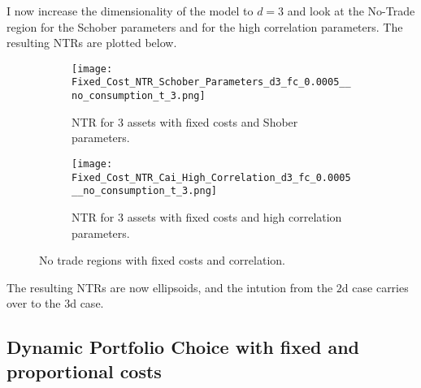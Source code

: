 \documentclass[11pt]{article}
\begin{document}
I now increase the dimensionality of the model to $d = 3$ and look at the No-Trade region for the Schober parameters and for the high correlation parameters.
The resulting \ac{NTR}s are plotted below.
\begin{figure}[!ht]
    \centering
    \begin{subfigure}[t]{0.48\textwidth}
        \centering
        \texttt{[image: Fixed\_Cost\_NTR\_Schober\_Parameters\_d3\_fc\_0.0005\_\_no\_consumption\_t\_3.png]}
        \caption{NTR for 3 assets with fixed costs and Shober parameters.}
        \label{fig: NTR_Fixed_3d_Shober}
    
    \end{subfigure}%
    \hfill
    \begin{subfigure}[t]{0.48\textwidth}
        \centering
        \texttt{[image: Fixed\_Cost\_NTR\_Cai\_High\_Correlation\_d3\_fc\_0.0005\_\_no\_consumption\_t\_3.png]}
        \caption{NTR for 3 assets with fixed costs and high correlation parameters.}
        \label{fig: NTR_Fixed_3d_high_correlation}
    \end{subfigure}
    \caption{No trade regions with fixed costs and correlation.}
\end{figure}
The resulting NTRs are now ellipsoids, and the intution from the $2$d case carries over to the $3$d case.


\subsection{Dynamic Portfolio Choice with fixed and proportional costs}

\ifdefined\COMPILINGMAIN
\else
\end{document}
